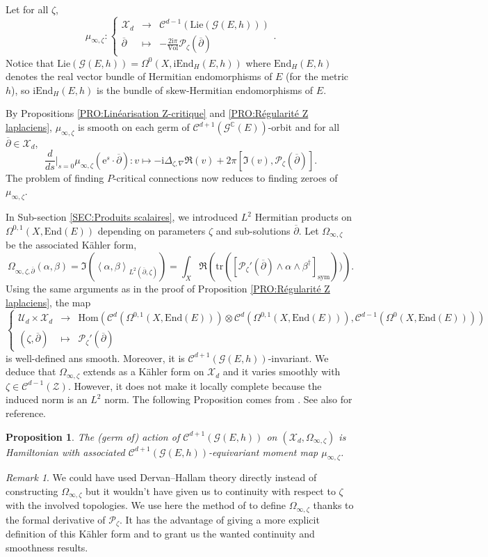 \documentclass{article}
\newtheorem{proposition}[theorem]{Proposition}
\theoremstyle{remark}
\newtheorem*{remark}{Remark}
\theoremstyle{definition}
\newcommand{\C}{\mathbb{C}}
\newcommand{\Hom}{\mathrm{Hom}}
\newcommand{\End}{\mathrm{End}}
\newcommand{\tr}{\mathrm{tr}}
\newcommand{\Vol}{\mathrm{Vol}}
\newcommand{\Lie}{\mathrm{Lie}}
\renewcommand{\i}{\boldsymbol{\mathrm{i}}}
\newcommand{\e}{\boldsymbol{\mathrm{e}}}
\newcommand{\scal}[2]{\left< #1,#2 \right>}
\newcommand{\G}{\mathcal{G}}
\newcommand{\mC}{\mathcal{C}}
\newcommand{\mP}{\mathcal{P}}
\newcommand{\mX}{\mathcal{X}}
\newcommand{\mZ}{\mathcal{Z}}
\newcommand{\mU}{\mathcal{U}}
\newcommand{\dbar}{\overline{\partial}}
\newcommand{\sym}{\mathrm{sym}}
\newcommand{\fonction}[4]{\left\{ \begin{array}{rcl}
		\displaystyle #1 & \longrightarrow & \displaystyle #2\\
		\displaystyle #3 & \longmapsto & \displaystyle #4
	\end{array} \right.}
\begin{document}
Let for all $\zeta$,
$$
\mu_{\infty,\zeta} : \fonction{\mX_d}{\mC^{d - 1}(\Lie(\G(E,h)))}{\dbar}{-\frac{2\i\pi}{\Vol}\mP_\zeta(\dbar)}.
$$
Notice that $\Lie(\G(E,h)) = \Omega^0(X,\i\End_H(E,h))$ where $\End_H(E,h)$ denotes the real vector bundle of Hermitian endomorphisms of $E$ (for the metric $h$), so $\i\End_H(E,h)$ is the bundle of skew-Hermitian endomorphisms of $E$.

By Propositions \ref{PRO:Linéarisation Z-critique} and \ref{PRO:Régularité Z laplaciens}, $\mu_{\infty,\zeta}$ is smooth on each germ of $\mC^{d + 1}(\G^\C(E))$-orbit and for all $\dbar \in \mX_d$,
$$
\frac{d}{ds}|_{s = 0}\mu_{\infty,\zeta}(\e^s \cdot \dbar) : v \mapsto -\i\Delta_{\zeta,\nabla}\Re(v) + 2\pi\left[\Im(v),\mP_\zeta(\dbar)\right].
$$
The problem of finding $P$-critical connections now reduces to finding zeroes of $\mu_{\infty,\zeta}$.

In Sub-section \ref{SEC:Produits scalaires}, we introduced $L^2$ Hermitian products on $\Omega^{0,1}(X,\End(E))$ depending on parameters $\zeta$ and sub-solutions $\dbar$. Let $\Omega_{\infty,\zeta}$ be the associated Kähler form,
$$
\Omega_{\infty,\zeta,\dbar}(\alpha,\beta) = \Im(\scal{\alpha}{\beta}_{L^2(\dbar,\zeta)}) = \int_X \Re\left(\tr([\mP_\zeta'(\dbar) \wedge \alpha \wedge \beta^\dagger]_\sym))\right).
$$
Using the same arguments as in the proof of Proposition \ref{PRO:Régularité Z laplaciens}, the map
$$
\fonction{\mU_d \times \mX_d}{\Hom(\mC^d(\Omega^{0,1}(X,\End(E))) \otimes \mC^d(\Omega^{0,1}(X,\End(E))),\mC^{d - 1}(\Omega^0(X,\End(E))))}{(\zeta,\dbar)}{\mP_\zeta'(\dbar)}
$$
is well-defined ans smooth. Moreover, it is $\mC^{d + 1}(\G(E,h))$-invariant. We deduce that $\Omega_{\infty,\zeta}$ extends as a Kähler form on $\mX_d$ and it varies smoothly with $\zeta \in \mC^{d - 1}(\mZ)$. However, it does not make it locally complete because the induced norm is an $L^2$ norm. The following Proposition comes from \cite[Theorem 2.45]{DMS}. See also \cite[Theorem 6.7]{Dervan_Hallam} for reference.

\begin{proposition}\label{PRO:Application moment dimension infinie}
    The (germ of) action of $\mC^{d + 1}(\G(E,h))$ on $(\mX_d,\Omega_{\infty,\zeta})$ is Hamiltonian with associated $\mC^{d + 1}(\G(E,h))$-equivariant moment map $\mu_{\infty,\zeta}$.
\end{proposition}

\begin{remark}
    We could have used Dervan--Hallam theory \cite[Theorem 6.7]{Dervan_Hallam} directly instead of constructing $\Omega_{\infty,\zeta}$ but it wouldn't have given us to continuity with respect to $\zeta$ with the involved topologies. We use here the method of \cite{DMS} to define $\Omega_{\infty,\zeta}$ thanks to the formal derivative of $\mP_\zeta$. It has the advantage of giving a more explicit definition of this Kähler form and to grant us the wanted continuity and smoothness results.
\end{remark}
\end{document}
